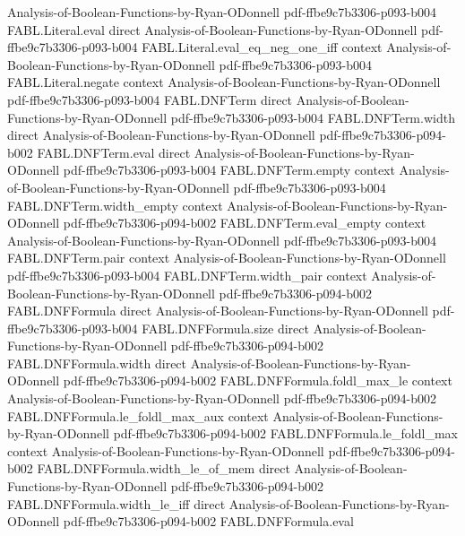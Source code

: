 \begin{theorem}
  {Analysis-of-Boolean-Functions-by-Ryan-ODonnell}
  {pdf-ffbe9c7b3306-p093-b004}
\proofstep
  {FABL.Literal.eval}
  {direct}
  {Analysis-of-Boolean-Functions-by-Ryan-ODonnell}
  {pdf-ffbe9c7b3306-p093-b004}
\proofstep
  {FABL.Literal.eval_eq_neg_one_iff}
  {context}
  {Analysis-of-Boolean-Functions-by-Ryan-ODonnell}
  {pdf-ffbe9c7b3306-p093-b004}
\proofstep
  {FABL.Literal.negate}
  {context}
  {Analysis-of-Boolean-Functions-by-Ryan-ODonnell}
  {pdf-ffbe9c7b3306-p093-b004}
\proofstep
  {FABL.DNFTerm}
  {direct}
  {Analysis-of-Boolean-Functions-by-Ryan-ODonnell}
  {pdf-ffbe9c7b3306-p093-b004}
\proofstep
  {FABL.DNFTerm.width}
  {direct}
  {Analysis-of-Boolean-Functions-by-Ryan-ODonnell}
  {pdf-ffbe9c7b3306-p094-b002}
\proofstep
  {FABL.DNFTerm.eval}
  {direct}
  {Analysis-of-Boolean-Functions-by-Ryan-ODonnell}
  {pdf-ffbe9c7b3306-p093-b004}
\proofstep
  {FABL.DNFTerm.empty}
  {context}
  {Analysis-of-Boolean-Functions-by-Ryan-ODonnell}
  {pdf-ffbe9c7b3306-p093-b004}
\proofstep
  {FABL.DNFTerm.width_empty}
  {context}
  {Analysis-of-Boolean-Functions-by-Ryan-ODonnell}
  {pdf-ffbe9c7b3306-p094-b002}
\proofstep
  {FABL.DNFTerm.eval_empty}
  {context}
  {Analysis-of-Boolean-Functions-by-Ryan-ODonnell}
  {pdf-ffbe9c7b3306-p093-b004}
\proofstep
  {FABL.DNFTerm.pair}
  {context}
  {Analysis-of-Boolean-Functions-by-Ryan-ODonnell}
  {pdf-ffbe9c7b3306-p093-b004}
\proofstep
  {FABL.DNFTerm.width_pair}
  {context}
  {Analysis-of-Boolean-Functions-by-Ryan-ODonnell}
  {pdf-ffbe9c7b3306-p094-b002}
\proofstep
  {FABL.DNFFormula}
  {direct}
  {Analysis-of-Boolean-Functions-by-Ryan-ODonnell}
  {pdf-ffbe9c7b3306-p093-b004}
\proofstep
  {FABL.DNFFormula.size}
  {direct}
  {Analysis-of-Boolean-Functions-by-Ryan-ODonnell}
  {pdf-ffbe9c7b3306-p094-b002}
\proofstep
  {FABL.DNFFormula.width}
  {direct}
  {Analysis-of-Boolean-Functions-by-Ryan-ODonnell}
  {pdf-ffbe9c7b3306-p094-b002}
\proofstep
  {FABL.DNFFormula.foldl_max_le}
  {context}
  {Analysis-of-Boolean-Functions-by-Ryan-ODonnell}
  {pdf-ffbe9c7b3306-p094-b002}
\proofstep
  {FABL.DNFFormula.le_foldl_max_aux}
  {context}
  {Analysis-of-Boolean-Functions-by-Ryan-ODonnell}
  {pdf-ffbe9c7b3306-p094-b002}
\proofstep
  {FABL.DNFFormula.le_foldl_max}
  {context}
  {Analysis-of-Boolean-Functions-by-Ryan-ODonnell}
  {pdf-ffbe9c7b3306-p094-b002}
\proofstep
  {FABL.DNFFormula.width_le_of_mem}
  {direct}
  {Analysis-of-Boolean-Functions-by-Ryan-ODonnell}
  {pdf-ffbe9c7b3306-p094-b002}
\proofstep
  {FABL.DNFFormula.width_le_iff}
  {direct}
  {Analysis-of-Boolean-Functions-by-Ryan-ODonnell}
  {pdf-ffbe9c7b3306-p094-b002}
\proofstep
  {FABL.DNFFormula.eval}

\end{theorem}
